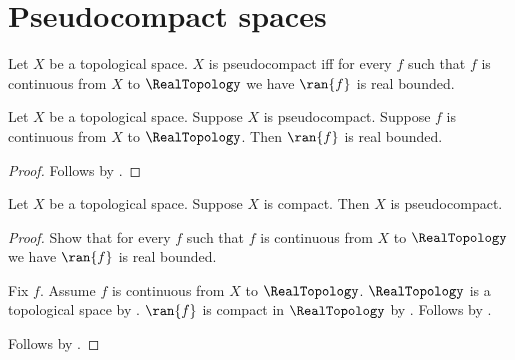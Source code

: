 \section{Pseudocompact spaces}







\begin{definition}\label{is_pseudocompact}
    Let $X$ be a topological space.
    $X$ is pseudocompact iff for every $f$ such that
        $f$ is continuous from $X$ to $\RealTopology$
        we have $\ran{f}$ is real bounded.
\end{definition}

\begin{theorem}\label{pseudocompact_continuous_real_map_bounded}
    Let $X$ be a topological space.
    Suppose $X$ is pseudocompact.
    Suppose $f$ is continuous from $X$ to $\RealTopology$.
    Then $\ran{f}$ is real bounded.
\end{theorem}
\begin{proof}
    Follows by .
\end{proof}

\begin{theorem}\label{compact_implies_pseudocompact}
    Let $X$ be a topological space.
    Suppose $X$ is compact.
    Then $X$ is pseudocompact.
\end{theorem}
\begin{proof}
    Show that for every $f$ such that
        $f$ is continuous from $X$ to $\RealTopology$
        we have $\ran{f}$ is real bounded.
    \begin{subproof}
        Fix $f$.
        Assume $f$ is continuous from $X$ to $\RealTopology$.
        $\RealTopology$ is a topological space by
            .
        $\ran{f}$ is compact in $\RealTopology$ by
            .
        Follows by .
    \end{subproof}
    Follows by .
\end{proof}

